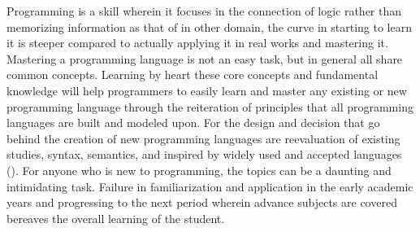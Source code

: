 \parx
Programming is a skill wherein it focuses in the connection of logic rather than
memorizing information as that of in other domain, the curve in starting to
learn it is steeper compared to actually applying it in real works and mastering
it. Mastering a programming language is not an easy task, but in general all
share common concepts. Learning by heart these core concepts and fundamental
knowledge will help programmers to easily learn and master any existing or new
programming language through the reiteration of principles that all programming
languages are built and modeled upon. For the design and decision that go behind
the creation of new programming languages are reevaluation of existing studies,
syntax, semantics, and inspired by widely used and accepted languages
(\cite{stefik_siebert_slattery_stefik_2011}). For anyone who is new to
programming, the topics can be a daunting and intimidating task. Failure in
familiarization and application in the early academic years and progressing to
the next period wherein advance subjects are covered bereaves the overall
learning of the student.

